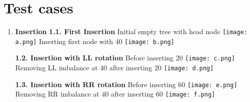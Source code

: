 \documentclass[12pt]{article}
\begin{document}
\begin{enumerate}
    \end{enumerate}
\section{Test cases}
    \begin{enumerate}
        \item \textbf{Insertion} \newline
        \textbf{1.1. First Insertion} \newline\newline \newline
        Initial empty tree with head node\newline\newline \newline\newline \newline
            \texttt{[image: a.png]} \newline\newline\newline
        Inserting first node with 40 \newline \newline\newline\newline \newline
            \texttt{[image: b.png]} \newline
        \newpage
        
        \textbf{1.2. Insertion with LL rotation} \newline
        Before inserting 20 \newline \newline
            \texttt{[image: c.png]} \newline 
        Removing LL imbalance at 40 after inserting 20 \newline\newline
            \texttt{[image: d.png]} \newline 
        \newpage
        
        \textbf{1.3. Insertion with RR rotation} \newline
        Before inserting 60 \newline \newline
            \texttt{[image: e.png]} \newline 
        Removing RR imbalance at 40 after inserting 60 \newline \newline
            \texttt{[image: f.png]} \newline \newline 
            

\end{enumerate}
\end{document}

